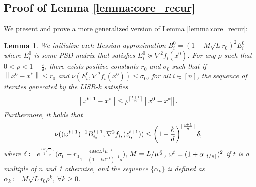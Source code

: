 \documentclass[letterpaper]{article} %
\theoremstyle{plain}
\newtheorem{lemma}[theorem]{Lemma}
\theoremstyle{definition}
\theoremstyle{remark}
\DeclarePairedDelimiter\ceil{\lceil}{\rceil}
\newcommand\norm[1]{\left\lVert#1\right\rVert}
\begin{document}
\subsection{Proof of Lemma \ref{lemma:core_recur}}\label{appendix:core_recur}
We present and prove a more generalized version of Lemma \ref{lemma:core_recur}:
\begin{lemma}
    We initialize each Hessian approximation $B_i^0 = (1 + M \sqrt{L} r_0)^2 E_i^0$ where $E_i^0$ is some PSD matrix that satisfies $E_i^0 \succeq \nabla^2 f_i(x^0)$. 
    For any $\rho$ such that $0 < \rho < 1 - \frac{k}{d}$, there exists positive constants $r_0$ and $\sigma_0$ such that if $\norm{x^0 - x^*} \leq r_0$ and $\nu(E_i^0, \nabla^2 f_i (x^0)) \leq \sigma_0$, for all $i \in [n]$, the sequence of iterates generated by the LISR-$k$ satisfies
    \begin{equation}
        \norm{x^{t+1} - x^*} \leq \rho^{\ceil{\frac{t+1}{n}}} \norm{x^0 - x^*}.
        \label{eq:sr_residual_recur_1}
    \end{equation}
    Furthermore, it holds that
    \begin{equation}
         \nu((\omega^{t+1})^{-1} B_{i_t}^{t+1}, \nabla^2 f_{i_t}(z_{i_t}^{t+1})) \leq \left(1 - \frac{k}{d} \right)^{\ceil{\frac{t+1}{n}}} \delta,
        \label{eq:sr_hessian_recur_2}
    \end{equation}
    where $\delta \coloneqq e^{\frac{4M \sqrt{L} r_0}{1 - \rho}}\big(\sigma_0 + r_0 \frac{4M d L^{\frac{3}{2}} \mu^{-1}}{1 - (1- k d^{-1})^{-1} \rho}\big)$, $M = \Tilde{L} / \mu^{\frac{3}{2}}$, $\omega^t = (1 + \alpha_{\ceil{t/n}})^2$  if $t$ is a multiple of $n$ and 1 otherwise, and the sequence $\{ \alpha_k\}$ is defined as $\alpha_k \coloneqq M \sqrt{L} r_0 \rho^k$, $\forall k \geq 0$.
    \label{lemma:srk_core_recur}
\end{lemma}
\end{document}
